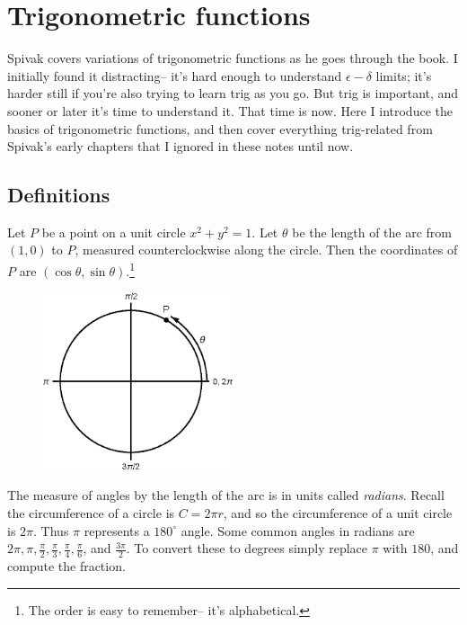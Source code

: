 \section{Trigonometric functions}

Spivak covers variations of trigonometric functions as he goes through
the book. I initially found it distracting-- it's hard enough to
understand $\epsilon-\delta$ limits; it's harder still if you're also trying to
learn trig as you go. But trig is important, and sooner or later it's
time to understand it. That time is now. Here I introduce the basics
of trigonometric functions, and then cover everything trig-related
from Spivak's early chapters that I ignored in these notes until now.

\subsection{Definitions}

Let $P$ be a point on a unit circle $x^2+y^2=1$. Let $\theta$ be the length
of the arc from $(1,0)$ to $P$, measured counterclockwise along the
circle. Then the coordinates of $P$ are
$(\cos\theta,\sin\theta)$.\footnote{The order is easy to remember-- it's
  alphabetical.}

\begin{figure}[htbp]
  \centering
  \includegraphics[width=0.5\textwidth]{eps/prereqs/trigtldr.eps}
\end{figure}

The measure of angles by the length of the arc is in units called
\textit{radians}. Recall the circumference of a circle is $C=2\pi r$,
and so the circumference of a unit circle is $2\pi$. Thus $\pi$ represents
a $180^\circ$ angle. Some common angles in radians are
$2\pi, \pi,\frac{\pi}{2}, \frac{\pi}{3}, \frac{\pi}{4}, \frac{\pi}{6}$, and
$\frac{3\pi}{2}$. To convert these to degrees simply replace $\pi$ with
$180$, and compute the fraction.

